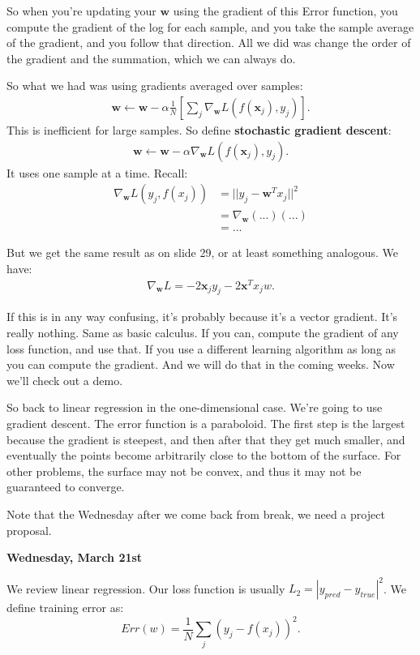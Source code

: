 \documentclass{amsbook}
\theoremstyle{plain}
\numberwithin{section}{chapter}
\numberwithin{equation}{chapter}
\theoremstyle{definition}
\theoremstyle{remark}
\newcommand{\bb}{\vspace{3mm}}
\newcommand{\vecc}{\mathbf}
\newcommand{\bee}{\begin{equation}\begin{aligned}}
\newcommand{\eee}{\end{aligned}\end{equation}}
\newcommand{\fracc}{\frac}
\begin{document}
So when you're updating your $\vecc{w}$ using the gradient of this Error function, you compute the gradient of the log for each sample, and you take the sample average of the gradient, and you follow that direction. All we did was change the order of the gradient and the summation, which we can always do. 



So what we had was using gradients averaged over samples:
\bee
\vecc{w} \longleftarrow \vecc{w} - \alpha \fracc{1}{N}\left[\sum_j \nabla_{\vecc{w}}L(f(\vecc{x}_j),y_j) \right].
\eee
This is inefficient for large samples. So define \textbf{stochastic gradient descent}:
\bee
\vecc{w} \longleftarrow \vecc{w} - \alpha \nabla_{\vecc{w}}L(f(\vecc{x}_j),y_j).
\eee
It uses one sample at a time. Recall:
\bee
\nabla_{\vecc{w}}L(y_j,f(x_j)) &= ||y_j - \vecc{w}^Tx_j||^2\\
&= \nabla_{\vecc{w}}(...)(...)\\
&= ...
\eee

But we get the same result as on slide 29, or at least something analogous. We have:
\bee
\nabla_{\vecc{w}}L = -2\vecc{x}_jy_j - 2\vecc{x}^Tx_jw.
\eee


If this is in any way confusing, it's probably because it's a vector gradient. It's really nothing. Same as basic calculus. If you can, compute the gradient of any loss function, and use that. If you use a different learning algorithm as long as you can compute the gradient. And we will do that in the coming weeks. Now we'll check out a demo. 

So back to linear regression in the one-dimensional case. We're going to use gradient descent. The error function is a paraboloid. The first step is the largest because the gradient is steepest, and then after that they get much smaller, and eventually the points become arbitrarily close to the bottom of the surface. For other problems, the surface may not be convex, and thus it may not be guaranteed to converge. 


Note that the Wednesday after we come back from break, we need a project proposal. 


\bb

\textbf{Wednesday, March 21st}

\bb

We review linear regression. Our loss function is usually $L_2 = |y_{pred} - y_{true}|^2$. We define training error as:
$$
Err(w) = \fracc{1}{N}\sum_j(y_j - f(x_j))^2.
$$
\end{document}

